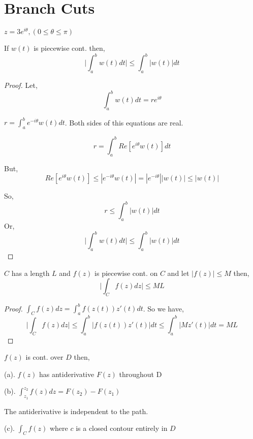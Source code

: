 \section{Branch Cuts}
\begin{eg}
   $z = 3e^{i\theta}, (0 \le \theta \le \pi)$
\end{eg}



\begin{lemma}
   If $w(t)$ is piecewise cont. then, 
   $$ \bigg | \int_a^b w(t) dt \bigg| \le \int_a^b |w(t)| dt$$       
\end{lemma}
\begin{proof}
   Let, 
   $$\int_a^b w(t) dt = re^{i\theta}$$

   $r = \int_a^b e^{-i\theta}w(t)dt$. Both sides of this equations are real.

   $$r = \int_a^b Re[e^{i\theta}w(t)]dt$$ 

   But, 
$$Re[e^{i\theta}w(t)] \le |e^{-i\theta}w(t)| = |e^{-i\theta}||w(t)| \le |w(t)|$$ 

So, 
$$ r \le \int_a^b |w(t)| dt $$ 
Or, 
$$ \bigg|\int_a^b w(t) dt \bigg| \le \int_a^b |w(t)|dt $$ 
\end{proof}

\begin{theorem}
   $C$ has a length $L$ and $f(z)$ is piecewise cont. on $C$ and let $|f(z)| \le M$ then, 
   $$ \bigg |\int_C f(z) dz \bigg | \le  ML  $$ 
\end{theorem}
\begin{proof}
   $\int_C f(z) dz = \int_a^b f(z(t)) z'(t) dt$. So we have, 
   $$ \bigg | \int_C f(z)dz \bigg | \le \int_a^b |f(z(t))z'(t)|dt \le \int_a^b |Mz'(t)|dt  = ML$$ 
\end{proof}


\begin{theorem}
   $f(z)$ is cont. over $D$ then, 

   (a). $f(z)$ has antiderivative $F(z)$ throughout D

   (b). $\int_{z_1}^{z_2} f(z) dz = F(z_2) - F(z_1)$

   The antiderivative is independent to the path.


   (c). $\int_C f(z)$ where $c$ is a closed contour entirely in $D$
\end{theorem}

